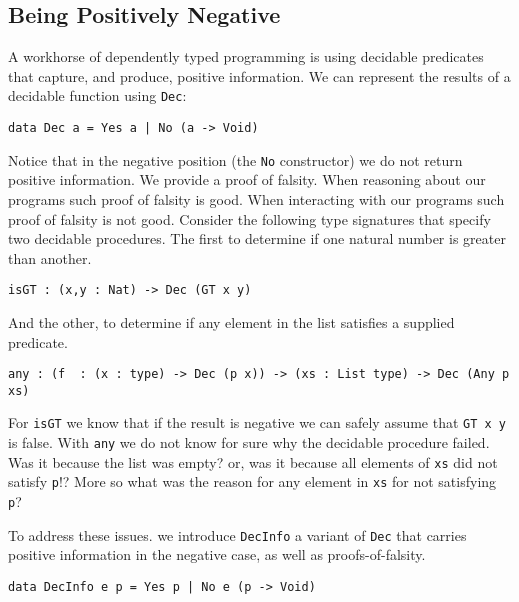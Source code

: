 
\subsection{Being Positively Negative}
\label{sec:idioms:posneg}

A workhorse of dependently typed programming is using decidable
predicates that capture, and produce, positive information.
We can represent the results of a decidable function using \texttt{Dec}:

\begin{verbatim}
data Dec a = Yes a | No (a -> Void)
\end{verbatim}

\noindent
Notice that in the negative position (the \texttt{No} constructor) we do not return positive information.
We provide a proof of falsity.
When reasoning about our programs such proof of falsity is good.
When interacting with our programs such proof of falsity is not good.
Consider the following type signatures that specify two decidable procedures.
The first to determine if one natural number is greater than another.

\begin{verbatim}
isGT : (x,y : Nat) -> Dec (GT x y)
\end{verbatim}

\noindent
And the other, to determine if any element in the list satisfies a supplied predicate.

\begin{verbatim}
any : (f  : (x : type) -> Dec (p x)) -> (xs : List type) -> Dec (Any p xs)
\end{verbatim}

For \texttt{isGT} we know that if the result is negative we can safely assume that \texttt{GT x y} is false.
With \texttt{any} we do not know for sure why the decidable procedure failed.
Was it because the list was empty?
or,
was it because all elements of \texttt{xs} did not satisfy \texttt{p}!?
More so what was the reason for any element in \texttt{xs} for not satisfying \texttt{p}?

To address these issues. we introduce \texttt{DecInfo} a variant of \texttt{Dec} that carries positive information in the negative case, as well as proofs-of-falsity.


\begin{verbatim}
data DecInfo e p = Yes p | No e (p -> Void)
\end{verbatim}

